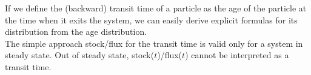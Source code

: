 If we define the (backward) transit time of a particle as the age of the particle 
at the time when it exits the system, we can easily derive explicit formulas for its distribution 
from the age distribution.\\
The simple approach stock/flux for the transit time is valid only for a system in steady state.
{\color{red}Out of steady state, stock($t$)/flux($t$) cannot be interpreted as a transit time.}

